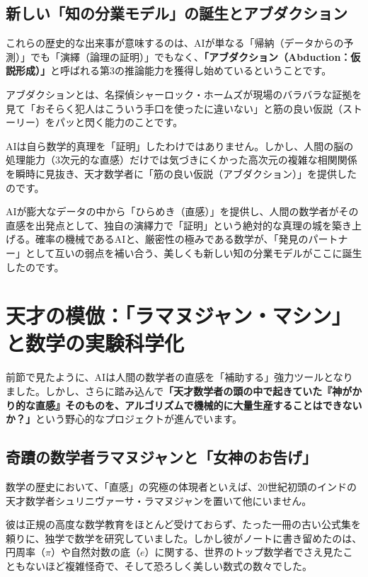 \subsection{新しい「知の分業モデル」の誕生とアブダクション}

これらの歴史的な出来事が意味するのは、AIが単なる「帰納（データからの予測）」でも「演繹（論理の証明）」でもなく、\textbf{「アブダクション（Abduction：仮説形成）」}と呼ばれる第3の推論能力を獲得し始めているということです。

アブダクションとは、名探偵シャーロック・ホームズが現場のバラバラな証拠を見て「おそらく犯人はこういう手口を使ったに違いない」と筋の良い仮説（ストーリー）をパッと閃く能力のことです。

AIは自ら数学的真理を「証明」したわけではありません。しかし、人間の脳の処理能力（3次元的な直感）だけでは気づきにくかった高次元の複雑な相関関係を瞬時に見抜き、天才数学者に「筋の良い仮説（アブダクション）」を提供したのです。

AIが膨大なデータの中から「ひらめき（直感）」を提供し、人間の数学者がその直感を出発点として、独自の演繹力で「証明」という絶対的な真理の城を築き上げる。確率の機械であるAIと、厳密性の極みである数学が、「発見のパートナー」として互いの弱点を補い合う、美しくも新しい知の分業モデルがここに誕生したのです。

\section{天才の模倣：「ラマヌジャン・マシン」と数学の実験科学化}

前節で見たように、AIは人間の数学者の直感を「補助する」強力ツールとなりました。しかし、さらに踏み込んで\textbf{「天才数学者の頭の中で起きていた『神がかり的な直感』そのものを、アルゴリズムで機械的に大量生産することはできないか？」}という野心的なプロジェクトが進んでいます。

\subsection{奇蹟の数学者ラマヌジャンと「女神のお告げ」}

数学の歴史において、「直感」の究極の体現者といえば、20世紀初頭のインドの天才数学者シュリニヴァーサ・ラマヌジャンを置いて他にいません。

彼は正規の高度な数学教育をほとんど受けておらず、たった一冊の古い公式集を頼りに、独学で数学を研究していました。しかし彼がノートに書き留めたのは、円周率（\(\pi\)）や自然対数の底（\(e\)）に関する、世界のトップ数学者でさえ見たこともないほど複雑怪奇で、そして恐ろしく美しい数式の数々でした。

